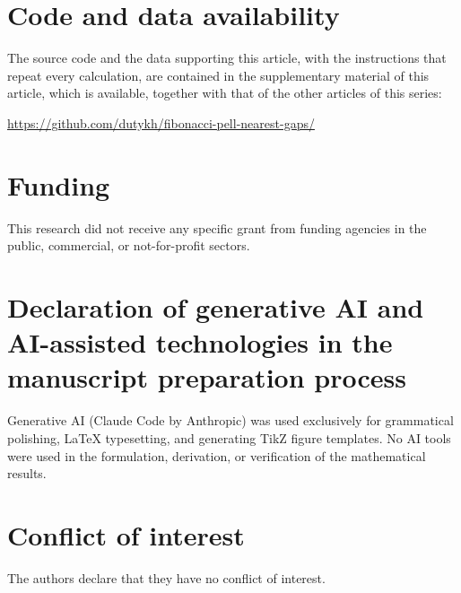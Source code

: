 \documentclass[11pt,reqno]{amsart}
\theoremstyle{definition}
\theoremstyle{definition}
\begin{document}
\section*{Code and data availability}
The source code and the data supporting this article, with the instructions
that repeat every calculation, are contained in the supplementary material of
this article, which is available, together with that of the other articles of
this series:
\par\nopagebreak
{\centering
\url{https://github.com/dutykh/fibonacci-pell-nearest-gaps/}
\par}

\section*{Funding}
This research did not receive any specific grant from funding agencies in the public, commercial,
or not-for-profit sectors.

\section*{Declaration of generative AI and AI-assisted technologies in the manuscript preparation process}
Generative AI (Claude Code by Anthropic) was used exclusively for grammatical polishing, LaTeX typesetting,
and generating TikZ figure templates. No AI tools were used in the formulation, derivation, or verification
of the mathematical results.

\section*{Conflict of interest}
The authors declare that they have no conflict of interest.



\end{document}
